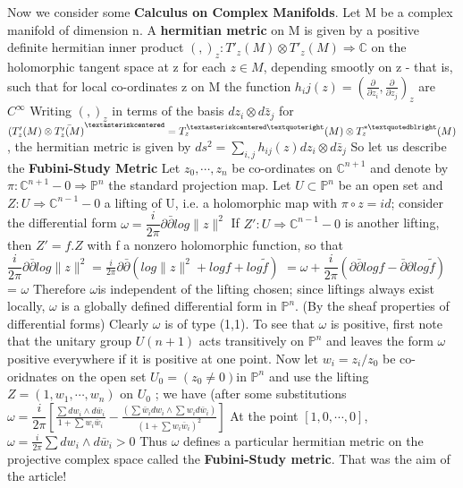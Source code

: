 \documentclass[12pt, oneside, a4paper]{article}
\theoremstyle{definition}
\def\Cbb{\ensuremath{\mathbb{C}}}
\newcommand{\tensor}{\otimes}
\newcommand{\To}{\Rightarrow}
\begin{document}
Now we consider some \textbf{Calculus on Complex Manifolds}. Let M be a complex manifold of dimension n. A \textbf{hermitian metric}
on M is given by a positive definite hermitian inner product 
$(,)_z: T'_z(M) \tensor T'_z(M) \To \Cbb$
on the holomorphic tangent space at z for each $z \in M$, \newline
depending smootly on z - that is, such that for local co-ordinates z on
M the function 
$h_ij(z) = (\frac{\partial}{\partial z_i},\frac{\partial}{\partial z_j})_z$
are $C^{\infty}$ Writing $(,)_z$ in terms of the basis ${dz_i \tensor d\bar{z}_j}$
for 
$(T'_z(M) \tensor \bar{T'_z(M)}^{\textasteriskcentered} = T^{\textasteriskcentered\textquoteright}_z(M) \tensor T^{* \textquotedblright}_{z}(M)$,
the hermitian metric is given by 
$ds^2 = \sum_{i,j} h_{ij}(z) dz_i \tensor d \bar{z}_j$
So let us describe the \textbf{Fubini-Study Metric}
Let $z_0,\cdots,z_n$ be co-ordinates on $\Cbb^{n+1}$ and denote by $\pi:\Cbb^{n+1} -{0} \To \mathbb{P}^n$
the standard projection map.
  Let $U \subset \mathbb{P}^{n}$ be an open set and $Z: U \To \Cbb^{n-1} - {0}$ a lifting of U, i.e. a holomorphic map with 
$\pi \circ z = id$; consider the differential form 
 \newline$\omega = \dfrac{i}{2\pi}\partial \bar{\partial}log\|z\|^{2}$
If $Z':U \To \Cbb^{n-1} - {0}$ is another lifting, then $Z' = f.Z$
with f a nonzero holomorphic function, so that \newline 
$\dfrac{i}{2\pi}\partial \bar{\partial}log\|z\|^{2} = \frac{i}{2 \pi}\partial \bar{\partial} (log\|z\|^{2} +
log f + log \tilde{f})$
\newline $= \omega + \dfrac{i}{2\pi}(\partial \bar{\partial}log f - \bar{\partial} \partial log \tilde{f})$
\newline = $\omega$
Therefore $\omega$is independent of the lifting chosen; since liftings always exist locally, $\omega$ is a
globally defined differential form in $\mathbb{P}^{n}$. (By the sheaf properties of differential forms) Clearly $\omega$
is of type (1,1). To see that $\omega$ is positive, first note that the unitary group $U(n+1)$ acts transitively on
 $\mathbb{P}^{n}$ and leaves the form $\omega$ positive everywhere if it is positive at one point. Now let ${w_i = z_i/z_0}$
be co-oridnates on the open set $U_{0} = (z_0 \neq 0)$in $\mathbb{P}^{n}$ and use the lifting $Z = (1,w_1,\cdots,w_n)$ on $U_0$
; we have (after some substitutions
\newline $\omega = \dfrac{i}{2 \pi} [\frac{\sum dw_i \wedge d\bar{w}_i}{1 + \sum w_i \bar{w}_i} - 
\frac{(\sum \bar{w}_i dw_i \wedge \sum w_i d\bar{w}_i)}{(1 + \sum w_i \bar{w}_i)^{2}}]$
At the point $[1,0,\cdots,0]$,
\newline $\omega = \frac{i}{2\pi} \sum dw_i \wedge d \bar{w}_i > 0$
Thus $\omega$ defines a particular hermitian metric on the projective complex space called the \textbf{Fubini-Study metric}.
That was the aim of the article!
\end{document}
